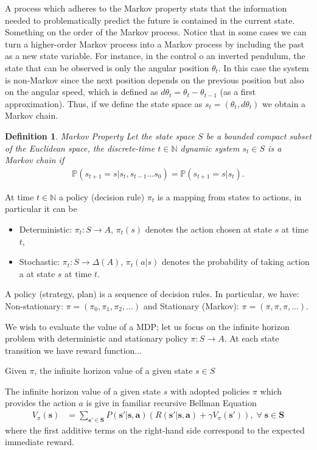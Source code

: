 \documentclass[]{usiinfdocprop}
\newtheorem{definition}[theorem]{Definition}
\newcommand{\bb}[1]{\boldsymbol{\mathbf{#1}}}
\begin{document}
A process which adheres to the Markov property stats that the information needed to problematically predict the future is contained in the current state. 
Something on the order of the Markov process. 
Notice that in some cases we can turn a higher-order Markov process into a Markov process by including the past as a new state variable. For instance, in the control o an inverted pendulum, the state that can be observed is only the angular position $\theta_t$. In this case the system is non-Markov since the next position depends on the previous position but also on the angular speed, which is defined as $d\theta_t = \theta_t - \theta_{t−1}$ (as a first approximation). Thus, if we define the state space as $s_t = (\theta_t, d\theta_t)$ we obtain a Markov chain.
%
\begin{definition}{Markov Property}
Let the state space $S$ be a bounded compact subset of the Euclidean space, the discrete-time $t \in \mathbb{N}$ dynamic system $s_t \in S$ is a Markov chain if
\begin{align}
    \mathbb{P}(s_{t+1}=s|s_t,s_{t-1} \ldots s_{0}) = \mathbb{P}(s_{t+1}=s|s_t). 
\end{align}
\end{definition}
%
At time $t \in \mathbb{N}$ a policy (decision rule) $\pi_t$ is a mapping from states to actions, in particular
it can be
\begin{itemize}
    \item Deterministic: $\pi_t : S \to A$, $\pi_t(s)$ denotes the action chosen at state $s$ at time $t$,
    \item Stochastic: $\pi_t : S \to \Delta(A)$, $\pi_t(a|s)$ denotes the probability of taking action a at state $s$ at time $t$.
\end{itemize}
%
A policy (strategy, plan) is a sequence of decision rules. In particular, we have: Non-stationary: $\pi = (\pi_0, \pi_1, \pi_2, 
\ldots)$ and Stationary (Markov): $\pi = (\pi, \pi, \pi,\ldots)$.



We wish to evaluate the value of a MDP; let us focus on the infinite horizon problem with deterministic and stationary policy $\pi : S \to A$. At each state transition we have reward function... 

Given $\pi$, the infinite horizon value of a given state $s \in S$

The infinite horizon value of a given state $s$ with adopted policies $\pi$ which provides the action $a$ is give in familiar recursive Bellman Equation
%
\begin{align}
    V_\pi(\bb{s}) &= \sum_{\bb{s}' \in \bb{S}} P(\bb{s}'|\bb{s},\bb{a}) \left( R(\bb{s}'|\bb{s},\bb{a}) + \gamma V_\pi(\bb{s}') \right), \; \forall \; \bb{s} \in \bb{S}      
\end{align}
where the first additive terms on the right-hand side correspond to the expected immediate reward.
\end{document}
